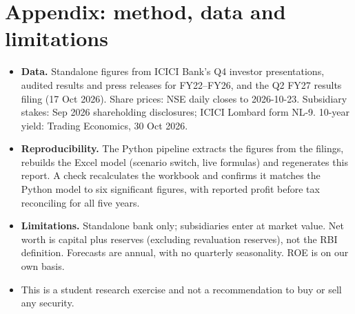 \documentclass[10pt,a4paper]{article}
\begin{document}
\section*{Appendix: method, data and limitations}
\footnotesize
\begin{itemize}
\item \textbf{Data.} Standalone figures from ICICI Bank's Q4 investor presentations, audited results and press releases for FY22--FY26, and the Q2 FY27 results filing (17 Oct 2026). Share prices: NSE daily closes to 2026-10-23. Subsidiary stakes: Sep 2026 shareholding disclosures; ICICI Lombard form NL-9. 10-year yield: Trading Economics, 30 Oct 2026.
\item \textbf{Reproducibility.} The Python pipeline extracts the figures from the filings, rebuilds the Excel model (scenario switch, live formulas) and regenerates this report. A check recalculates the workbook and confirms it matches the Python model to six significant figures, with reported profit before tax reconciling for all five years.
\item \textbf{Limitations.} Standalone bank only; subsidiaries enter at market value. Net worth is capital plus reserves (excluding revaluation reserves), not the RBI definition. Forecasts are annual, with no quarterly seasonality. ROE is on our own basis.
\item This is a student research exercise and not a recommendation to buy or sell any security.
\end{itemize}
\end{document}
